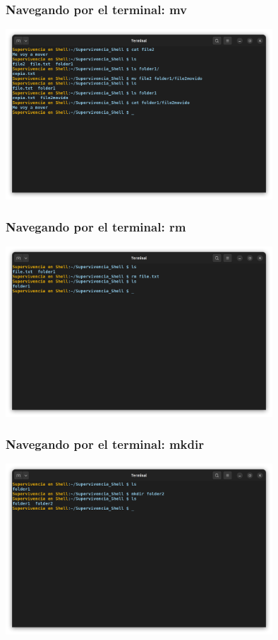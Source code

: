 \documentclass[10pt]{beamer}
\begin{document}
	\begin{frame}
		\frametitle{Navegando por el terminal: mv}
		\includegraphics[width=0.75\textwidth]{mv}
	\end{frame}	
		
	\begin{frame}
		\frametitle{Navegando por el terminal: rm}
		\includegraphics[width=0.75\textwidth]{rm}
	\end{frame}	
		
	\begin{frame}
		\frametitle{Navegando por el terminal: mkdir}
		\includegraphics[width=0.75\textwidth]{mkdir}
	\end{frame}	
\end{document}
